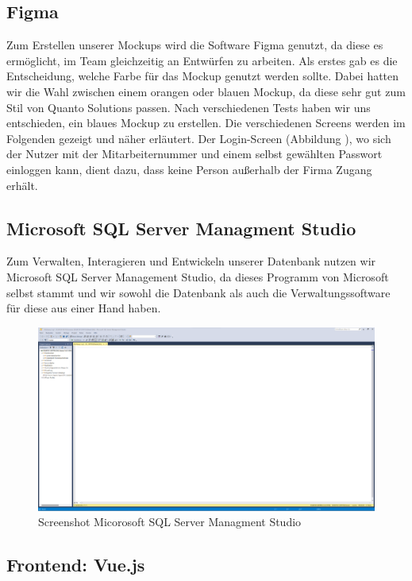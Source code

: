 \documentclass{article}
\begin{document}
\subsection{Figma}
Zum Erstellen unserer Mockups wird die Software Figma genutzt, da diese es
ermöglicht, im Team gleichzeitig an Entwürfen zu arbeiten. Als erstes gab es
die Entscheidung, welche Farbe für das Mockup genutzt werden sollte. Dabei
hatten wir die Wahl zwischen einem orangen oder blauen Mockup, da diese sehr
gut zum Stil von Quanto Solutions passen. Nach verschiedenen Tests haben wir
uns entschieden, ein blaues Mockup zu erstellen. Die verschiedenen Screens
werden im Folgenden gezeigt und näher erläutert. Der Login-Screen (Abbildung ),
wo sich der Nutzer mit der Mitarbeiternummer und einem selbst gewählten
Passwort einloggen kann, dient dazu, dass keine Person außerhalb der Firma
Zugang erhält.

\subsection{Microsoft SQL Server Managment Studio}
Zum Verwalten, Interagieren und Entwickeln unserer Datenbank nutzen wir
Microsoft SQL Server Management Studio, da dieses Programm von Microsoft selbst
stammt und wir sowohl die Datenbank als auch die Verwaltungssoftware für diese
aus einer Hand haben.

\begin{figure}[h]
    \centering
    \includegraphics[width= \textwidth]{images/Microsoft SQL Server Management Studio.png}
    \caption{Screenshot Micorosoft SQL Server Managment Studio}
    \label{fig:beispiel}
\end{figure}
\subsection{Frontend: Vue.js}
\end{document}
